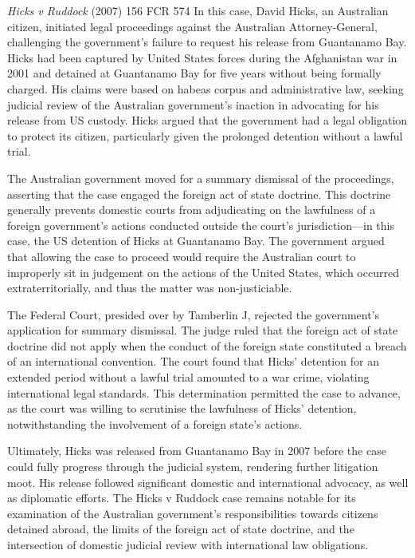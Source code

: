 \begin{casedetails}{\textit{Hicks v Ruddock} (2007) 156 FCR 574}
    \flushleft
    In this case, David Hicks, an Australian citizen, initiated legal proceedings against the Australian Attorney-General, challenging the government's failure to request his release from Guantanamo Bay. Hicks had been captured by United States forces during the Afghanistan war in 2001 and detained at Guantanamo Bay for five years without being formally charged. His claims were based on habeas corpus and administrative law, seeking judicial review of the Australian government's inaction in advocating for his release from US custody. Hicks argued that the government had a legal obligation to protect its citizen, particularly given the prolonged detention without a lawful trial.

    \vspace{\baselineskip}

    The Australian government moved for a summary dismissal of the proceedings, asserting that the case engaged the foreign act of state doctrine. This doctrine generally prevents domestic courts from adjudicating on the lawfulness of a foreign government's actions conducted outside the court's jurisdiction—in this case, the US detention of Hicks at Guantanamo Bay. The government argued that allowing the case to proceed would require the Australian court to improperly sit in judgement on the actions of the United States, which occurred extraterritorially, and thus the matter was non-justiciable.

    \vspace{\baselineskip}

    The Federal Court, presided over by Tamberlin J, rejected the government's application for summary dismissal. The judge ruled that the foreign act of state doctrine did not apply when the conduct of the foreign state constituted a breach of an international convention. The court found that Hicks' detention for an extended period without a lawful trial amounted to a war crime, violating international legal standards. This determination permitted the case to advance, as the court was willing to scrutinise the lawfulness of Hicks' detention, notwithstanding the involvement of a foreign state's actions.

    \vspace{\baselineskip}

    Ultimately, Hicks was released from Guantanamo Bay in 2007 before the case could fully progress through the judicial system, rendering further litigation moot. His release followed significant domestic and international advocacy, as well as diplomatic efforts. The Hicks v Ruddock case remains notable for its examination of the Australian government's responsibilities towards citizens detained abroad, the limits of the foreign act of state doctrine, and the intersection of domestic judicial review with international law obligations.
\end{casedetails}

